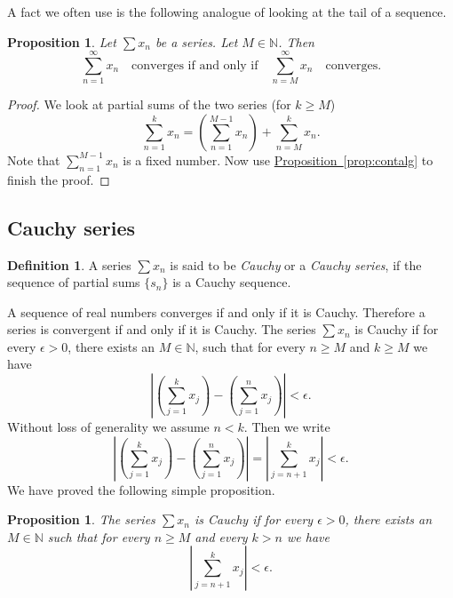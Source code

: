 \documentclass[12pt]{book}
\newcommand{\abs}[1]{\left\lvert {#1} \right\rvert}
\newcommand{\N}{{\mathbb{N}}}
\theoremstyle{plain}
\newtheorem{prop}[thm]{Proposition}
\theoremstyle{remark}
\theoremstyle{definition}
\newtheorem{defn}[thm]{Definition}
\theoremstyle{exercise}
\theoremstyle{example}
\newcommand{\propref}[1]{\hyperref[#1]{Proposition~\ref*{#1}}}
\begin{document}
\medskip

A fact we often use is the following analogue of looking at the tail of
a sequence.

\begin{prop}
Let $\sum x_n$ be a series.  Let $M \in \N$.  Then
\begin{equation*}
\sum_{n=1}^\infty x_n \quad \text{converges if and only if} \quad
\sum_{n=M}^\infty x_n \quad \text{converges.}
\end{equation*}
\end{prop}

\begin{proof}
We look at partial sums of the two series (for $k \geq M$)
\begin{equation*}
\sum_{n=1}^{k} x_n
=
\left(
\sum_{n=1}^{M-1} x_n
\right)
+
\sum_{n=M}^{k} x_n .
\end{equation*}
Note that 
$\sum_{n=1}^{M-1} x_n$ is a fixed number.  Now use
\propref{prop:contalg} to finish the proof.
\end{proof}

\subsection{Cauchy series}

\begin{defn}
A series $\sum x_n$ is said to be \emph{Cauchy} or a
\emph{Cauchy series},
if the sequence of partial sums $\{ s_n \}$ is a Cauchy sequence.
\end{defn}

A sequence of real numbers converges if and only if it is
Cauchy.  Therefore a series is convergent if and only if it is Cauchy.
The series $\sum x_n$ is Cauchy if for every $\epsilon > 0$,
there exists an $M \in \N$, such that for every $n \geq M$
and $k \geq M$ we have
\begin{equation*}
\abs{ \left( \sum_{j=1}^k x_j \right) - \left( \sum_{j=1}^n x_j \right) }
< \epsilon .
\end{equation*}
Without loss of generality we assume $n < k$.  Then we write
\begin{equation*}
\abs{ \left( \sum_{j=1}^k x_j \right) - \left( \sum_{j=1}^n x_j \right) }
=
\abs{ \sum_{j={n+1}}^k x_j }
< \epsilon .
\end{equation*}
We have proved the following simple proposition.

\begin{prop} \label{prop:cachyser}
The series $\sum x_n$ is Cauchy if for every $\epsilon > 0$, 
there exists an $M \in \N$ such that for every $n \geq M$
and every $k > n$ we have
\begin{equation*}
\abs{ \sum_{j={n+1}}^k x_j }
< \epsilon .
\end{equation*}
\end{prop}
\end{document}
